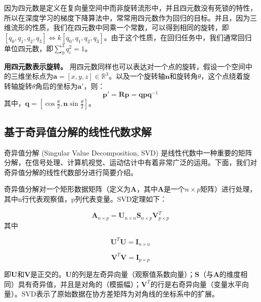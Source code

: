 因为四元数是定义在复向量空间中而非旋转流形中，并且四元数没有死锁的特性，所以在深度学习的梯度下降算法中，常常用四元数作为回归的目标。并且，因为三维流形的性质，我们在四元数中同乘一个常数，可以得到相同的旋转，即$[q_0, q_1, q_2, q_3] \iff k[q_0, q_1, q_2, q_3]$。由于这个性质，在回归任务中，我们通常回归单位四元数，即$\sum_0^3 q_i^2 = 1$。

{\bf 用四元数表示旋转。} 用四元数同样也可以表达对一个点的旋转，假设一个空间中的三维坐标点为$\boldsymbol{a} = [x, y, z] \in \mathbb{R}^3$。以及一个旋转轴$\boldsymbol{n}$和旋转角$\theta$，这个点绕着旋转轴旋转$\theta$角后的坐标为$\boldsymbol{a}'$，则：
\begin{equation}
    \boldsymbol{p}' = \boldsymbol{Rp} = \boldsymbol{qpq}^{-1}
\end{equation}
其中，$\boldsymbol{q} = [\cos \frac{\theta}{2}, \boldsymbol{n} \sin \frac{\theta}{2}]$。

\subsection{基于奇异值分解的线性代数求解}
奇异值分解\cite{levinson2020analysis} (Singular Value Decomposition, SVD) 是线性代数中一种重要的矩阵分解，在信号处理、计算机视觉、运动估计中有着非常广泛的运用。下面，我们对奇异值分解的线性代数部分进行简要介绍。

奇异值分解对一个矩形数据矩阵（定义为$\boldsymbol{A}$，其中$\boldsymbol{A}$是一个$n \times p$矩阵）进行处理，其中n行代表观察值，p列代表变量。SVD定理如下：

\begin{equation}
\boldsymbol{A}_{n \times p} = \boldsymbol{U}_{n \times n} \boldsymbol{S}_{n \times p} \boldsymbol{V}^T_{p \times p}
\end{equation}
其中

\begin{equation}
\boldsymbol{U}^T \boldsymbol{U} = \boldsymbol{I}_{n \times n}
\end{equation}

\begin{equation}
\boldsymbol{V}^T \boldsymbol{V} = \boldsymbol{I}_{p \times p}
\end{equation}

即$\boldsymbol{U}$和$\boldsymbol{V}$是正交的。$\boldsymbol{U}$的列是左奇异向量（观察值系数向量）；$\boldsymbol{S}$（与$\boldsymbol{A}$的维度相同）具有奇异值，并且是对角的（模振幅）；$\boldsymbol{V}^T$的行是右奇异向量（变量水平向量）。SVD表示了原始数据在协方差矩阵为对角线的坐标系中的扩展。

